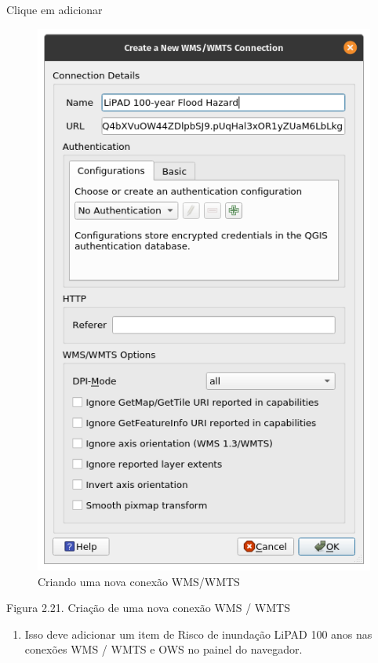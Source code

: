 \documentclass[
]{book}
\providecommand{\tightlist}{%
  \setlength{\itemsep}{0pt}\setlength{\parskip}{0pt}}
\begin{document}
Clique em adicionar

\begin{figure}
\centering
\includegraphics{media/modulo2/wms-1.png}
\caption{Criando uma nova conexão WMS/WMTS}
\end{figure}

Figura 2.21. Criação de uma nova conexão WMS / WMTS

\begin{enumerate}
\def\labelenumi{\arabic{enumi}.}
\setcounter{enumi}{4}
\tightlist
\item
  Isso deve adicionar um item de Risco de inundação LiPAD 100 anos nas conexões WMS / WMTS e OWS no painel do navegador.
\end{enumerate}
\end{document}
